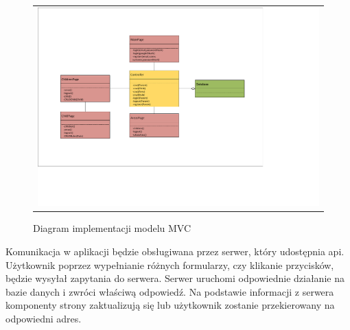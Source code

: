\documentclass{sprawozdanie-agh}
\begin{document}
		\begin{figure}[H] 
			\centering
			\begin{tabular}{c}
				\includegraphics[width=.95\textwidth]{MVC_cropped} 
			\end{tabular} 
			\caption{Diagram implementacji modelu MVC}
		\end{figure}

		Komunikacja w aplikacji będzie obsługiwana przez serwer, który udostępnia api. Użytkownik poprzez wypełnianie różnych formularzy, czy klikanie przycisków, będzie wysyłał zapytania do serwera. Serwer uruchomi odpowiednie działanie na bazie danych i zwróci właściwą odpowiedź. Na podstawie informacji z serwera komponenty strony zaktualizują się lub użytkownik zostanie przekierowany na odpowiedni adres.
		
\end{document}
